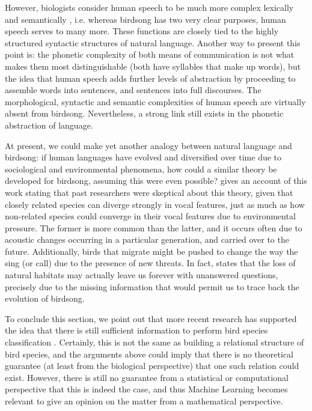 \documentclass[../main.tex]{subfiles} \label{chapter_soa}
\begin{document}
\par However, biologists consider human speech to be much more complex lexically and semantically \cite{Berwick2013}, i.e. whereas birdsong has two very clear purposes, human speech serves to many more. These functions are closely tied to the highly structured syntactic structures of natural language. Another way to present this point is: the phonetic complexity of both means of communication is not what makes them most distinguishable (both have syllables that make up words), but the idea that human speech adds further levels of abstraction by proceeding to assemble words into sentences, and sentences into full discourses. The morphological, syntactic and semantic complexities of human speech are virtually absent from birdsong. Nevertheless, a strong link still exists in the phonetic abstraction of language.
\par At present, we could make yet another analogy between natural language and birdsong: if human languages have evolved and diversified over time due to sociological and environmental phenomena, how could a similar theory be developed for birdsong, assuming this were even possible? \cite{Cate2004} gives an account of this work stating that past researchers were skeptical about this theory, given that closely related species can diverge strongly in vocal features, just as much as how non-related species could converge in their vocal features due to environmental pressure. The former is more common than the latter, and it occurs often due to acoustic changes occurring in a particular generation, and carried over to the future. Additionally, birds that migrate might be pushed to change the way the sing (or call) due to the presence of new threats. In fact, \cite{Marler2004} states that the loss of natural habitats may actually leave us forever with unanswered questions, precisely due to the missing information that would permit us to trace back the evolution of birdsong.
\par To conclude this section, we point out that more recent research has supported the idea that there is still sufficient information to perform bird species classification \cite{Naguib2014}. Certainly, this is not the same as building a relational structure of bird species, and the arguments above could imply that there is no theoretical guarantee (at least from the biological perspective) that one such relation could exist. However, there is still no guarantee from a statistical or computational perspective that this is indeed the case, and thus Machine Learning becomes relevant to give an opinion on the matter from a mathematical perspective.
\end{document}
